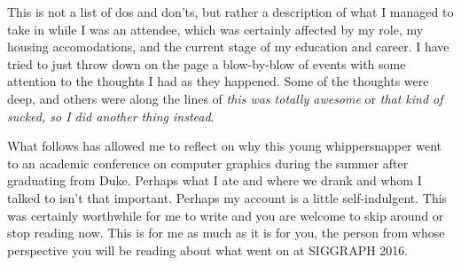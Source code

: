 \documentclass[a4paper, 11pt]{article} %
\begin{document}
This is not a list of dos and don'ts, but rather a description of what I managed to take in while I was an attendee, which was certainly affected by my role, my housing accomodations, and the current stage of my education and career. I have tried to just throw down on the page a blow-by-blow of events with some attention to the thoughts I had as they happened. Some of the thoughts were deep, and others were along the lines of \textit{this was totally awesome} or \textit{that kind of sucked, so I did another thing instead}.

What follows has allowed me to reflect on why this young whippersnapper went to an academic conference on computer graphics during the summer after graduating from Duke. Perhaps what I ate and where we drank and whom I talked to isn't that important. Perhaps my account is a little self-indulgent. This was certainly worthwhile for me to write and you are welcome to skip around or stop reading now. This is for me as much as it is for you, the person from whose perspective you will be reading about what went on at SIGGRAPH 2016.

\eject

\tableofcontents

\eject



\newpage



\newpage



\newpage



\newpage



\newpage



\newpage



\newpage



\newpage




%


%

\end{document}

